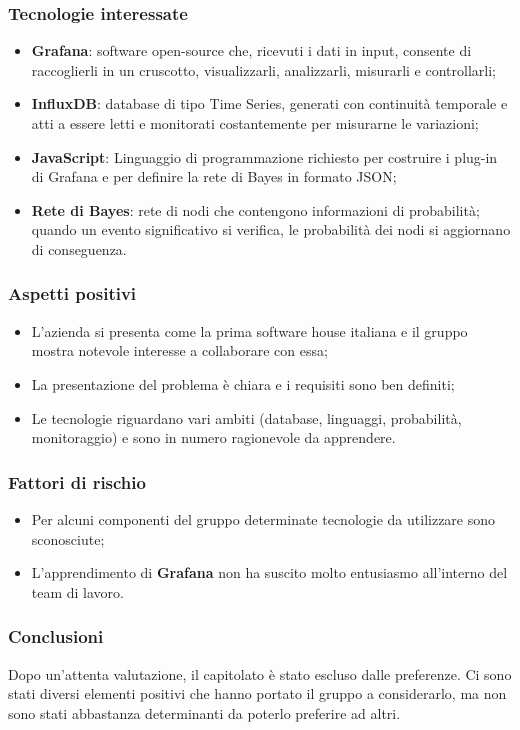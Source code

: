 \subsubsection{Tecnologie interessate}
\begin{itemize}
	\item \textbf{Grafana}: software open-source\glo{} che, ricevuti i dati in 
input,
	 consente di raccoglierli in un cruscotto, visualizzarli, analizzarli, 
	 misurarli e controllarli;
	\item \textbf{InfluxDB}: database di tipo Time Series\glo{}, generati con 
continuità
	 temporale e atti a essere letti e monitorati costantemente per misurarne 
	 le variazioni;
	\item \textbf{JavaScript}: Linguaggio di programmazione richiesto per costruire i plug-in\glo{} di Grafana e per definire la rete di Bayes in formato JSON\glo;
	\item \textbf{Rete di Bayes}: rete di nodi che contengono informazioni di 
probabilità; quando un evento significativo si verifica, le probabilità dei nodi si aggiornano di conseguenza.
\end{itemize}
\subsubsection{Aspetti positivi}
\begin{itemize}
	\item L'azienda si presenta come la prima software house italiana e il gruppo 
mostra 
	notevole interesse a collaborare con essa;
	\item La presentazione del problema è chiara e i requisiti sono ben definiti;
	\item Le tecnologie riguardano vari ambiti (database, linguaggi, probabilità, 
	monitoraggio) e sono in numero ragionevole da apprendere.
\end{itemize}
\subsubsection{Fattori di rischio}
\begin{itemize}
	\item Per alcuni componenti del gruppo determinate tecnologie da  utilizzare 
	sono sconosciute;
	\item L'apprendimento di \textbf{Grafana} non ha suscito molto 
	entusiasmo all'interno del team di lavoro.
\end{itemize}
\subsubsection{Conclusioni}
Dopo un'attenta valutazione, il capitolato è stato escluso dalle preferenze. Ci 
sono stati diversi elementi positivi che hanno portato il gruppo a considerarlo,
ma non sono stati abbastanza determinanti da poterlo preferire ad altri.

